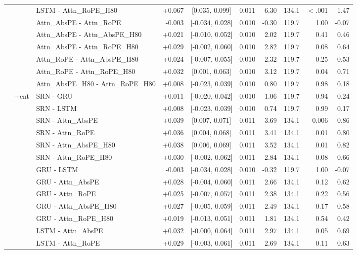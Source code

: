 \begin{longtable}{@{}lllrcrrrrr@{}}
 &  & LSTM - Attn\_RoPE\_H80 & +0.067 & [0.035, 0.099] & 0.011 & 6.30 & 134.1 & $<$.001 & 1.47 \\
 &  & Attn\_AbsPE - Attn\_RoPE & -0.003 & [-0.034, 0.028] & 0.010 & -0.30 & 119.7 & 1.00 & -0.07 \\
 &  & Attn\_AbsPE - Attn\_AbsPE\_H80 & +0.021 & [-0.010, 0.052] & 0.010 & 2.02 & 119.7 & 0.41 & 0.46 \\
 &  & Attn\_AbsPE - Attn\_RoPE\_H80 & +0.029 & [-0.002, 0.060] & 0.010 & 2.82 & 119.7 & 0.08 & 0.64 \\
 &  & Attn\_RoPE - Attn\_AbsPE\_H80 & +0.024 & [-0.007, 0.055] & 0.010 & 2.32 & 119.7 & 0.25 & 0.53 \\
 &  & Attn\_RoPE - Attn\_RoPE\_H80 & +0.032 & [0.001, 0.063] & 0.010 & 3.12 & 119.7 & 0.04 & 0.71 \\
 &  & Attn\_AbsPE\_H80 - Attn\_RoPE\_H80 & +0.008 & [-0.023, 0.039] & 0.010 & 0.80 & 119.7 & 0.98 & 0.18 \\
\addlinespace[2pt]
 & $+$ent & SRN - GRU & +0.011 & [-0.020, 0.042] & 0.010 & 1.06 & 119.7 & 0.94 & 0.24 \\
 &  & SRN - LSTM & +0.008 & [-0.023, 0.039] & 0.010 & 0.74 & 119.7 & 0.99 & 0.17 \\
 &  & SRN - Attn\_AbsPE & +0.039 & [0.007, 0.071] & 0.011 & 3.69 & 134.1 & 0.006 & 0.86 \\
 &  & SRN - Attn\_RoPE & +0.036 & [0.004, 0.068] & 0.011 & 3.41 & 134.1 & 0.01 & 0.80 \\
 &  & SRN - Attn\_AbsPE\_H80 & +0.038 & [0.006, 0.069] & 0.011 & 3.52 & 134.1 & 0.01 & 0.82 \\
 &  & SRN - Attn\_RoPE\_H80 & +0.030 & [-0.002, 0.062] & 0.011 & 2.84 & 134.1 & 0.08 & 0.66 \\
 &  & GRU - LSTM & -0.003 & [-0.034, 0.028] & 0.010 & -0.32 & 119.7 & 1.00 & -0.07 \\
 &  & GRU - Attn\_AbsPE & +0.028 & [-0.004, 0.060] & 0.011 & 2.66 & 134.1 & 0.12 & 0.62 \\
 &  & GRU - Attn\_RoPE & +0.025 & [-0.007, 0.057] & 0.011 & 2.38 & 134.1 & 0.22 & 0.56 \\
 &  & GRU - Attn\_AbsPE\_H80 & +0.027 & [-0.005, 0.059] & 0.011 & 2.49 & 134.1 & 0.17 & 0.58 \\
 &  & GRU - Attn\_RoPE\_H80 & +0.019 & [-0.013, 0.051] & 0.011 & 1.81 & 134.1 & 0.54 & 0.42 \\
 &  & LSTM - Attn\_AbsPE & +0.032 & [-0.000, 0.064] & 0.011 & 2.97 & 134.1 & 0.05 & 0.69 \\
 &  & LSTM - Attn\_RoPE & +0.029 & [-0.003, 0.061] & 0.011 & 2.69 & 134.1 & 0.11 & 0.63 \\

\end{longtable}
